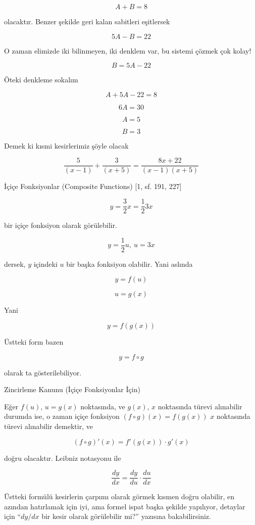 \documentclass[12pt,fleqn]{article}\usepackage{../../common}
\begin{document}
$$ A + B = 8 $$

olacaktır. Benzer şekilde geri kalan sabitleri eşitlersek 

$$ 5A - B = 22 $$

O zaman elimizde iki bilinmeyen, iki denklem var, bu sistemi çözmek çok
kolay! 

$$ B = 5A - 22 $$

Öteki denkleme sokalım

$$ A + 5A - 22 = 8 $$

$$ 6A = 30 $$

$$ A = 5 $$

$$ B = 3 $$

Demek ki kısmi kesirlerimiz şöyle olacak 

$$ \frac{5}{(x-1)} + \frac{3}{(x+5)} = \frac{8x + 22}{(x-1)(x+5)}$$

\newpage

İçiçe Fonksiyonlar (Composite Functions) [1, sf. 191, 227]

$$ y = \frac{3}{2}x = \frac{1}{2}3x $$

bir içiçe fonksiyon olarak görülebilir. 

$$ y = \frac{1}{2}u, \ u=3x $$

dersek, $y$ içindeki $u$ bir başka fonksiyon olabilir. Yani aslında 

$$ y = f(u) $$

$$ u = g(x) $$

Yani

$$ y = f(g(x)) $$

Üstteki form bazen 

$$ y = f \circ g $$

olarak ta gösterilebiliyor. 

\newpage

Zincirleme Kanunu (İçiçe Fonksiyonlar İçin)

Eğer $f(u)$, $u=g(x)$ noktasında, ve $g(x)$, $x$ noktasında türevi
alınabilir durumda ise, o zaman içiçe fonksiyon $(f \circ g)(x) = f(g(x))$
$x$ noktasında türevi alınabilir demektir, ve

$$ (f \circ g)'(x) = f'(g(x)) \cdot g'(x) $$

doğru olacaktır. Leibniz notasyonu ile 

$$ \frac{ dy}{dx} = \frac{ dy}{du} \cdot \frac{ du}{dx} $$

Üstteki formülü kesirlerin çarpımı olarak görmek kısmen doğru olabilir, en
azından hatırlamak için iyi, ama formel ispat başka şekilde yapılıyor,
detaylar için ``$dy/dx$ bir kesir olarak görülebilir mi?'' yazısına
bakabilirsiniz.
\end{document}
